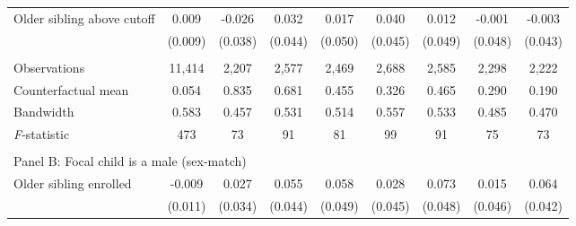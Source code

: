 \begin{table}[!htbp]
{{\begin{tabular}{lcccccccc}
Older sibling above cutoff&       0.009   &      -0.026   &       0.032   &       0.017   &       0.040   &       0.012   &      -0.001   &      -0.003   \\
                    &     (0.009)   &     (0.038)   &     (0.044)   &     (0.050)   &     (0.045)   &     (0.049)   &     (0.048)   &     (0.043)   \\
                    &               &               &               &               &               &               &               &               \\
Observations        &      11,414   &       2,207   &       2,577   &       2,469   &       2,688   &       2,585   &       2,298   &       2,222   \\
Counterfactual mean &       0.054   &       0.835   &       0.681   &       0.455   &       0.326   &       0.465   &       0.290   &       0.190   \\
Bandwidth           &       0.583   &       0.457   &       0.531   &       0.514   &       0.557   &       0.533   &       0.485   &       0.470   \\
\textit{F}-statistic&         473   &          73   &          91   &          81   &          99   &          91   &          75   &          73   \\
 
&  &  &  & & & & & \\
\multicolumn{10}{l}{Panel B: Focal child is a male (sex-match)} \\
Older sibling enrolled&      -0.009   &       0.027   &       0.055   &       0.058   &       0.028   &       0.073   &       0.015   &       0.064   \\
                    &     (0.011)   &     (0.034)   &     (0.044)   &     (0.049)   &     (0.045)   &     (0.048)   &     (0.046)   &     (0.042)   \\
 

\end{tabular}}}
\end{table}
